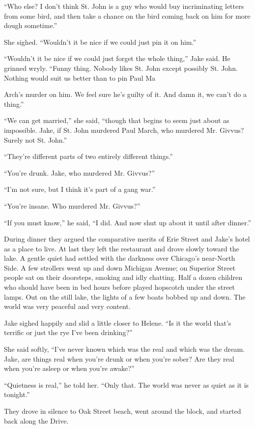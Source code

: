\documentclass{novel}
\begin{document}
“Who else? I don’t think St. John is a guy who would buy incriminating letters from some bird, and then take a chance on the bird coming back on him for more dough sometime.”

She sighed. “Wouldn’t it be nice if we could just pin it on him.”

“Wouldn’t it be nice if we could just forget the whole thing,” Jake said. He grinned wryly. “Funny thing. Nobody likes St. John except possibly St. John. Nothing would suit us better than to pin Paul Ma

Arch’s murder on him. We feel sure he’s guilty of it. And damn it, we can’t do a thing.”

“We can get married,” she said, “though that begins to seem just about as impossible. Jake, if St. John murdered Paul March, who murdered Mr. Givvus? Surely not St. John.”

“They’re different parts of two entirely different things.”

“You’re drunk. Jake, who murdered Mr. Givvus?”

“I’m not sure, but I think it’s part of a gang war.”

“You’re insane. Who murdered Mr. Givvus?”

“If you must know,” he said, “I did. And now shut up about it until after dinner.”

During dinner they argued the comparative merits of Erie Street and Jake’s hotel as a place to live. At last they left the restaurant and drove slowly toward the lake. A gentle quiet had settled with the darkness over Chicago’s near-North Side. A few strollers went up and down Michigan Avenue; on Superior Street people sat on their doorsteps, smoking and idly chatting. Half a dozen children who should have been in bed hours before played hopscotch under the street lamps. Out on the still lake, the lights of a few boats bobbed up and down. The world was very peaceful and very content.

Jake sighed happily and slid a little closer to Helene. “Is it the world that’s terrific or just the rye I’ve been drinking?”

She said softly, “I've never known which was the real and which was the dream. Jake, are things real when you’re drunk or when you’re sober? Are they real when you’re asleep or when you’re awake?”

“Quietness is real,” he told her. “Only that. The world was never as quiet as it is tonight.”

They drove in silence to Oak Street beach, went around the block, and started back along the Drive.
\end{document}
